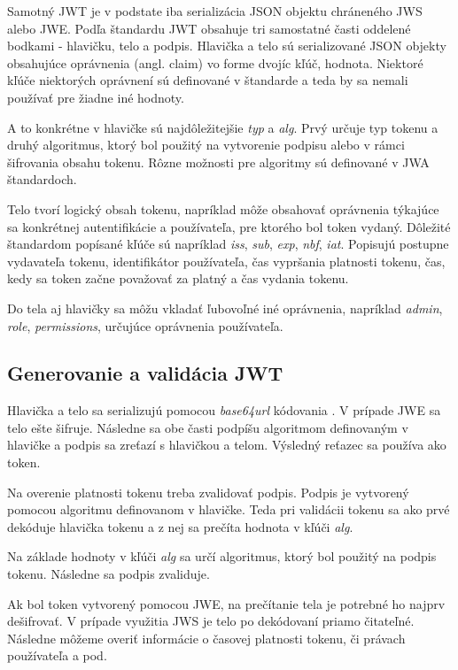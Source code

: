 Samotný JWT je v podstate iba serializácia JSON objektu chráneného JWS alebo JWE. Podľa štandardu JWT obsahuje tri samostatné časti oddelené bodkami - hlavičku, telo a podpis. Hlavička a telo sú serializované JSON objekty obsahujúce oprávnenia (angl. claim) vo forme dvojíc kľúč, hodnota. Niektoré kľúče niektorých oprávnení sú definované v štandarde a teda by sa nemali používať pre žiadne iné hodnoty. 

A to konkrétne v hlavičke sú najdôležitejšie \textit{typ} a \textit{alg}. Prvý určuje typ tokenu a druhý algoritmus, ktorý bol použitý na vytvorenie podpisu alebo v rámci šifrovania obsahu tokenu. Rôzne možnosti pre algoritmy sú definované v JWA štandardoch.

Telo tvorí logický obsah tokenu, napríklad môže obsahovať oprávnenia týkajúce sa konkrétnej autentifikácie a používateľa, pre ktorého bol token vydaný. Dôležité štandardom popísané kľúče sú napríklad \textit{iss}, \textit{sub}, \textit{exp}, \textit{nbf}, \textit{iat}. Popisujú postupne vydavateľa tokenu, identifikátor používateľa, čas vypršania platnosti tokenu, čas, kedy sa token začne považovať za platný a čas vydania tokenu.

Do tela aj hlavičky sa môžu vkladať ľubovoľné iné oprávnenia, napríklad \textit{admin}, \textit{role}, \textit{permissions}, určujúce oprávnenia používateľa.

\subsection{Generovanie a validácia JWT}

Hlavička a telo sa serializujú pomocou \textit{base64url} kódovania \cite{base64_rfc}. V prípade JWE sa telo ešte šifruje. Následne sa obe časti podpíšu algoritmom definovaným v hlavičke a podpis sa zreťazí s hlavičkou a telom. Výsledný reťazec sa používa ako token.

Na overenie platnosti tokenu treba zvalidovať podpis. Podpis je vytvorený pomocou algoritmu definovanom v hlavičke. Teda pri validácii tokenu sa ako prvé dekóduje hlavička tokenu a z nej sa prečíta hodnota v kľúči \textit{alg}.

Na základe hodnoty v kľúči \textit{alg} sa určí algoritmus, ktorý bol použitý na podpis tokenu. Následne sa podpis zvaliduje. 

Ak bol token vytvorený pomocou JWE, na prečítanie tela je potrebné ho najprv dešifrovať. V prípade využitia JWS je telo po dekódovaní priamo čitateľné. Následne môžeme overiť informácie o časovej platnosti tokenu, či právach používateľa a pod.

